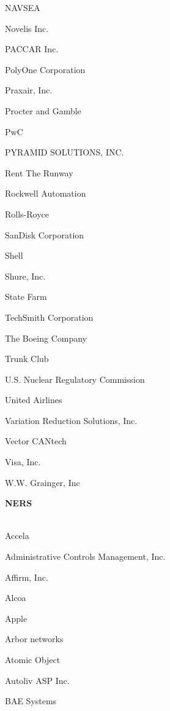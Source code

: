 \documentclass[twoside]{article}
\begin{document}
\begin{center}
\begin{multicols}{5}
\begin{FlushLeft}
\begin{compactitem}
\item NAVSEA
\item Novelis Inc.
\item PACCAR Inc.
\item PolyOne Corporation
\item Praxair, Inc.
\item Procter and Gamble
\item PwC
\item PYRAMID SOLUTIONS, INC.
\item Rent The Runway
\item Rockwell Automation
\item Rolls-Royce
\item SanDisk Corporation
\item Shell
\item Shure, Inc.
\item State Farm
\item TechSmith Corporation
\item The Boeing Company
\item Trunk Club
\item U.S. Nuclear Regulatory Commission
\item United Airlines
\item Variation Reduction Solutions, Inc.
\item Vector CANtech
\item Visa, Inc.
\item W.W. Grainger, Inc
\end{compactitem}
        \end{FlushLeft}
        \vspace{1em}
        {\fontsize{14}{16}\selectfont \bf NERS}\\
        \vspace{-1em}
        ~\hrulefill~
        \vspace{-.9em}
        \begin{FlushLeft}
        \begin{compactitem}
        \item Accela
\item Administrative Controls Management, Inc.
\item Affirm, Inc.
\item Alcoa
\item Apple
\item Arbor networks
\item Atomic Object
\item Autoliv ASP Inc.
\item BAE Systems

\end{compactitem}
\end{FlushLeft}
\end{multicols}
\end{center}
\end{document}

